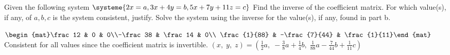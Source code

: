 


\begin{Exercise}[
name={},
title={}, 
difficulty=0,
origin={\cite{YL}}]
Given the following system
$\systeme{2x=a,3x+4y=b,5x+7y+11z=c}$
\Question Find the inverse of the coefficient matrix.
\Question For which value(s), if any, of $a, b, c$ is the system consistent, justify.
\Question Solve the system using the inverse for the value(s), if any, found in part b.
\end{Exercise}
\begin{Answer}
\Question $\begin{mat}\frac12 & 0 & 0\\-\frac38 & \frac14 & 0\\ \frac{1}{88} & -\frac{7}{44} & \frac{1}{11}\end{mat}$
\Question Consistent for all values since the coefficient matrix is invertible.
\Question $(x,\;y,\;z)=\left(\frac12a,\; -\frac38a+\frac14b,\; \frac{1}{88}a-\frac{7}{44}b+\frac{1}{11}c\right)$
\end{Answer}
